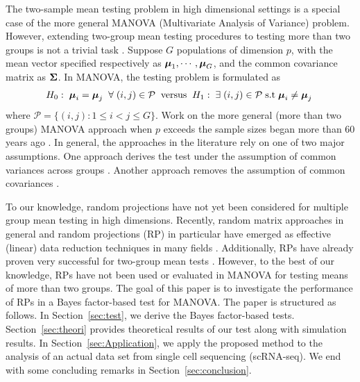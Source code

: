 \documentclass[times,sort&compress,3p]{elsarticle}
\theoremstyle{plain}%
\theoremstyle{definition}
\def\be{\begin{eqnarray}}
\def\ee{\end{eqnarray}}
\newcommand{\umu}               {\mbox{\boldmath$\mu$}}
\newcommand{\uSigma}            {\mbox{\boldmath$\Sigma$}}
\begin{document}
The two-sample mean testing problem in high dimensional settings is a special case of the more general MANOVA (Multivariate Analysis of Variance) problem. However, extending two-group mean testing procedures to testing more than two groups is not a trivial task \cite{cai2014high}. Suppose $G$ populations of dimension $p$, with the mean vector specified respectively as $\umu_1, \cdots, \umu_{G}$, and the common covariance matrix as $\uSigma$. In MANOVA, the testing problem is formulated as
\be
H_{0}:\; \umu_i = \umu_j\; \; \forall \; (i,j) \in \mathcal{P}\;  \; \mbox{versus} \; \; H_{1}:\; \exists \; (i,j) \in \mathcal{P}\; \mbox{s.t}   \; \umu_i \neq \umu_j\;  \label{eq:test1}
\ee
where $\mathcal{P} = \{(i,j): 1 \leq i < j \leq G  \}$.
Work on the more general (more than two groups) MANOVA approach when $p$ exceeds the sample sizes began more than 60 years ago \cite{dempster1958high,dempster1960significance}. In general, the approaches in the literature rely on one of two major assumptions. One approach derives the test under the assumption of common variances across groups \cite{fujikoshi2004asymptotic}. Another approach removes the assumption of common covariances \cite{srivastava2007multivariate}.

To our knowledge, random projections have not yet been considered for multiple group mean testing in high dimensions. Recently, random matrix approaches in general and random projections (RP) in particular have emerged as effective (linear) data reduction techniques in many fields \cite{wan2020sharp,lopez2021tuning}. Additionally, RPs have already proven very successful for two-group mean tests \cite{lopes2011more, srivastava2014raptt,zoh2018powerful}. However, to the best of our knowledge, RPs have not been used or evaluated in MANOVA for testing means of more than two groups. The goal of this paper is to investigate the performance of RPs in a Bayes factor-based test for MANOVA. The paper is structured as follows. In Section~\ref{sec:test}, we derive the Bayes factor-based tests. Section~\ref{sec:theori} provides theoretical results of our test along with simulation results. In Section~\ref{sec:Application}, we apply the proposed method to the analysis of an actual data set from single cell sequencing (scRNA-seq). We end with some concluding remarks in Section~\ref{sec:conclusion}. 
 
\end{document}
